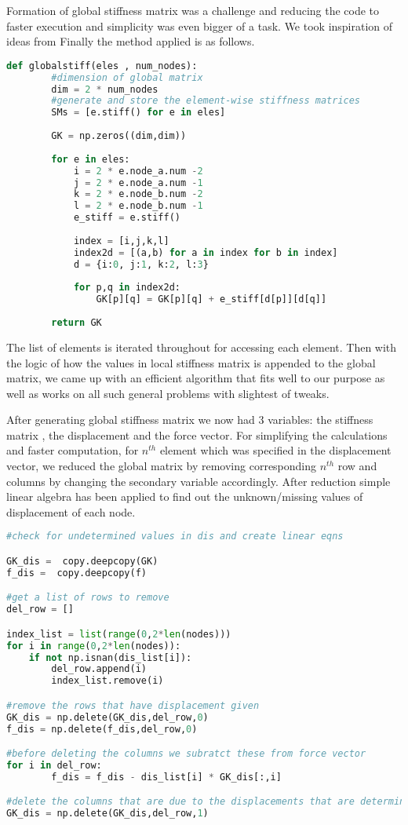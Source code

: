 Formation of global stiffness matrix was a challenge and reducing the code to faster execution and simplicity was even bigger of a task. We took inspiration of ideas from \cite{kattan2010matlab} Finally the method applied is as follows.


\begin{lstlisting}[language=Python , basicstyle=\linespread{0.75}\listingsfont]
	def globalstiff(eles , num_nodes):
		#dimension of global matrix
		dim = 2 * num_nodes
		#generate and store the element-wise stiffness matrices
		SMs = [e.stiff() for e in eles]
	
		GK = np.zeros((dim,dim))
		
		for e in eles:
			i = 2 * e.node_a.num -2
			j = 2 * e.node_a.num -1
			k = 2 * e.node_b.num -2
			l = 2 * e.node_b.num -1
			e_stiff = e.stiff()
	
			index = [i,j,k,l]
			index2d = [(a,b) for a in index for b in index]
			d = {i:0, j:1, k:2, l:3}
			
			for p,q in index2d:
			    GK[p][q] = GK[p][q] + e_stiff[d[p]][d[q]]
		
		return GK
\end{lstlisting}

The list of elements is iterated throughout for accessing each element. Then with the logic of how the values in local stiffness matrix is appended to the global matrix, we came up with an efficient algorithm that fits well to our purpose as well as works on all such general problems with slightest of tweaks.

After generating global stiffness matrix we now had 3 variables: the stiffness matrix , the displacement and the force vector. For simplifying the calculations and faster computation, for $n^{th}$ element which was specified in the displacement vector, we reduced the global matrix by removing corresponding $n^{th}$ row and columns by changing the secondary variable accordingly.  After reduction simple linear algebra has been applied to find out the unknown/missing values of displacement of each node. 

\begin{lstlisting}[language=Python , basicstyle=\linespread{0.75}\listingsfont]
#check for undetermined values in dis and create linear eqns

GK_dis =  copy.deepcopy(GK)
f_dis =  copy.deepcopy(f)

#get a list of rows to remove
del_row = []

index_list = list(range(0,2*len(nodes)))
for i in range(0,2*len(nodes)):
    if not np.isnan(dis_list[i]):
        del_row.append(i)
        index_list.remove(i)

#remove the rows that have displacement given
GK_dis = np.delete(GK_dis,del_row,0)
f_dis = np.delete(f_dis,del_row,0)

#before deleting the columns we subratct these from force vector
for i in del_row:
        f_dis = f_dis - dis_list[i] * GK_dis[:,i]

#delete the columns that are due to the displacements that are determined
GK_dis = np.delete(GK_dis,del_row,1)
\end{lstlisting}


